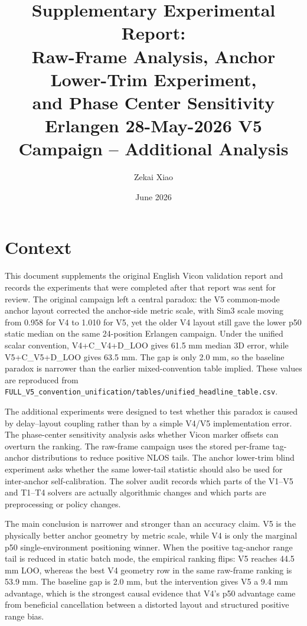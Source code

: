 \documentclass[11pt,a4paper]{article}
\title{Supplementary Experimental Report:\\
       Raw-Frame Analysis, Anchor Lower-Trim Experiment,\\
       and Phase Center Sensitivity\\[5pt]
       \large Erlangen 28-May-2026 V5 Campaign -- Additional Analysis}
\author{Zekai Xiao}
\date{June 2026}
\begin{document}
\maketitle
\tableofcontents
\newpage

\section{Context}

This document supplements the original English Vicon validation report and records the experiments that were completed after that report was sent for review. The original campaign left a central paradox: the V5 common-mode anchor layout corrected the anchor-side metric scale, with Sim3 scale moving from 0.958 for V4 to 1.010 for V5, yet the older V4 layout still gave the lower p50 static median on the same 24-position Erlangen campaign. Under the unified scalar convention, V4+C\_V4+D\_LOO gives 61.5 mm median 3D error, while V5+C\_V5+D\_LOO gives 63.5 mm. The gap is only 2.0 mm, so the baseline paradox is narrower than the earlier mixed-convention table implied. These values are reproduced from \texttt{FULL\_V5\_convention\_unification/tables/unified\_headline\_table.csv}.

The additional experiments were designed to test whether this paradox is caused by delay--layout coupling rather than by a simple V4/V5 implementation error. The phase-center sensitivity analysis asks whether Vicon marker offsets can overturn the ranking. The raw-frame campaign uses the stored per-frame tag-anchor distributions to reduce positive NLOS tails. The anchor lower-trim blind experiment asks whether the same lower-tail statistic should also be used for inter-anchor self-calibration. The solver audit records which parts of the V1--V5 and T1--T4 solvers are actually algorithmic changes and which parts are preprocessing or policy changes.

The main conclusion is narrower and stronger than an accuracy claim. V5 is the physically better anchor geometry by metric scale, while V4 is only the marginal p50 single-environment positioning winner. When the positive tag-anchor range tail is reduced in static batch mode, the empirical ranking flips: V5 reaches 44.5 mm LOO, whereas the best V4 geometry row in the same raw-frame ranking is 53.9 mm. The baseline gap is 2.0 mm, but the intervention gives V5 a 9.4 mm advantage, which is the strongest causal evidence that V4's p50 advantage came from beneficial cancellation between a distorted layout and structured positive range bias.
\end{document}
